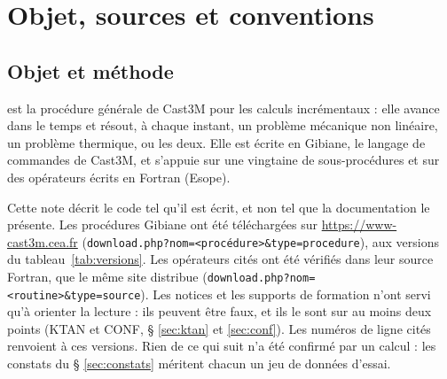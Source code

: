 \section{Objet, sources et conventions}

\subsection{Objet et méthode}

 est la procédure générale de Cast3M pour les calculs incrémentaux : elle avance dans le temps et résout, à chaque instant, un problème mécanique non linéaire, un problème thermique, ou les deux.
Elle est écrite en Gibiane, le langage de commandes de Cast3M, et s'appuie sur une vingtaine de sous-procédures et sur des opérateurs écrits en Fortran (Esope).

Cette note décrit le code tel qu'il est écrit, et non tel que la documentation le présente.
Les procédures Gibiane ont été téléchargées sur \url{https://www-cast3m.cea.fr} (\texttt{download.php?nom=<procédure>\&type=procedure}), aux versions du tableau~\ref{tab:versions}.
Les opérateurs cités ont été vérifiés dans leur source Fortran, que le même site distribue (\texttt{download.php?nom=<routine>\&type=source}).
Les notices et les supports de formation n'ont servi qu'à orienter la lecture : ils peuvent être faux, et ils le sont sur au moins deux points (KTAN et CONF, § \ref{sec:ktan} et \ref{sec:conf}).
Les numéros de ligne cités renvoient à ces versions.
Rien de ce qui suit n'a été confirmé par un calcul : les constats du § \ref{sec:constats} méritent chacun un jeu de données d'essai.

